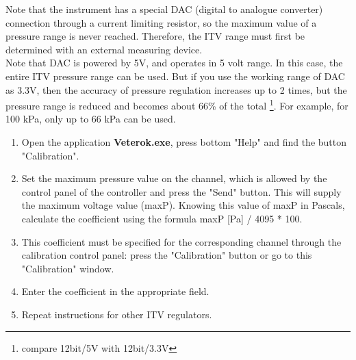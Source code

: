 \documentclass[twoside, 12pt, a4paper]{refart}
\begin{document}
    Note that the instrument has a special DAC (digital to analogue converter) connection through a current limiting resistor, so the maximum value of a pressure range is never reached. Therefore, the ITV range must first be determined with an external measuring device.\\
    
    Note that DAC is powered by 5V, and operates in 5 volt range. In this case, the entire ITV pressure range can be used. But if you use the working range of DAC as 3.3V, then the accuracy of pressure regulation increases up to 2 times, but the pressure range is reduced and becomes about 66\% of the total \footnote{compare 12bit/5V with 12bit/3.3V}. For example, for 100 kPa, only up to 66 kPa can be used.
        
      \begin{enumerate}
        \item Open the application \textbf{Veterok.exe}, press bottom "Help" and find the button "Calibration".    
        \item Set the maximum pressure value on the channel, which is allowed by the control panel of the controller and press the "Send" button. This will supply the maximum voltage value (maxP). Knowing this value of maxP in Pascals, calculate the coefficient using the formula maxP [Pa] / 4095 * 100.
        \item This coefficient must be specified for the corresponding channel through the calibration control panel: press the "Calibration" button or go to this "Calibration" window.
        \item Enter the coefficient in the appropriate field.
        \item Repeat instructions for other ITV regulators.
      \end{enumerate}
     
      
         
\end{document}
